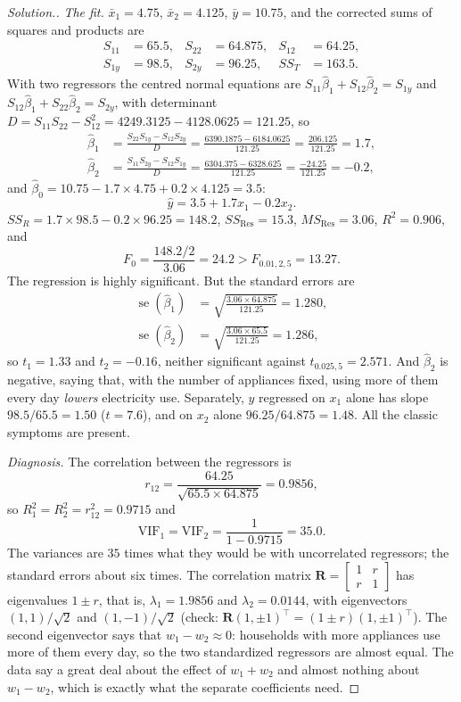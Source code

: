 \documentclass[11pt,a4paper]{article}
\numberwithin{equation}{section}
\theoremstyle{definition}
\newenvironment{solution}
  {\renewcommand{\qedsymbol}{}\begin{proof}[\textit{Solution}.]}
  {\end{proof}}
\begin{document}
\begin{solution}
\emph{The fit.} $\bar x_1 = 4.75$, $\bar x_2 = 4.125$, $\bar y = 10.75$, and the corrected sums of
squares and products are
\begin{align*}
S_{11} &= 65.5, & S_{22} &= 64.875, & S_{12} &= 64.25, \\
S_{1y} &= 98.5, & S_{2y} &= 96.25, & SS_T &= 163.5 .
\end{align*}
With two regressors the centred normal equations are
$S_{11}\hat\beta_1 + S_{12}\hat\beta_2 = S_{1y}$ and $S_{12}\hat\beta_1 + S_{22}\hat\beta_2 = S_{2y}$, with
determinant $D = S_{11}S_{22} - S_{12}^2 = 4249.3125 - 4128.0625 = 121.25$, so
\begin{align*}
\hat\beta_1 &= \frac{S_{22}S_{1y} - S_{12}S_{2y}}{D} = \frac{6390.1875 - 6184.0625}{121.25} = \frac{206.125}{121.25} = 1.7, \\
\hat\beta_2 &= \frac{S_{11}S_{2y} - S_{12}S_{1y}}{D} = \frac{6304.375 - 6328.625}{121.25} = \frac{-24.25}{121.25} = -0.2 ,
\end{align*}
and $\hat\beta_0 = 10.75 - 1.7 \times 4.75 + 0.2 \times 4.125 = 3.5$:
\[
\hat y = 3.5 + 1.7x_1 - 0.2x_2 .
\]
$SS_R = 1.7 \times 98.5 - 0.2 \times 96.25 = 148.2$, $SS_{\mathrm{Res}} = 15.3$, $MS_{\mathrm{Res}} = 3.06$,
$R^2 = 0.906$, and
\[
F_0 = \frac{148.2/2}{3.06} = 24.2 > F_{0.01,2,5} = 13.27 .
\]
The regression is highly significant. But the standard errors are
\begin{align*}
\operatorname{se}(\hat\beta_1) &= \sqrt{\frac{3.06 \times 64.875}{121.25}} = 1.280, \\
\operatorname{se}(\hat\beta_2) &= \sqrt{\frac{3.06 \times 65.5}{121.25}} = 1.286 ,
\end{align*}
so $t_1 = 1.33$ and $t_2 = -0.16$, neither significant against $t_{0.025,5} = 2.571$. And
$\hat\beta_2$ is negative, saying that, with the number of appliances fixed, using more of them
every day \emph{lowers} electricity use. Separately, $y$ regressed on $x_1$ alone has slope
$98.5/65.5 = 1.50$ ($t = 7.6$), and on $x_2$ alone $96.25/64.875 = 1.48$. All the classic symptoms
are present.

\emph{Diagnosis.} The correlation between the regressors is
\[
r_{12} = \frac{64.25}{\sqrt{65.5 \times 64.875}} = 0.9856 ,
\]
so $R_1^2 = R_2^2 = r_{12}^2 = 0.9715$ and
\[
\mathrm{VIF}_1 = \mathrm{VIF}_2 = \frac{1}{1 - 0.9715} = 35.0 .
\]
The variances are $35$ times what they would be with uncorrelated regressors; the standard errors
about six times. The correlation matrix
$\mathbf{R} = \begin{bmatrix} 1 & r \\ r & 1 \end{bmatrix}$ has eigenvalues $1 \pm r$, that is,
$\lambda_1 = 1.9856$ and $\lambda_2 = 0.0144$, with eigenvectors $(1, 1)/\sqrt2$ and $(1, -1)/\sqrt2$
(check: $\mathbf{R}(1, \pm1)^\top = (1 \pm r)(1, \pm1)^\top$). The second eigenvector says that
$w_1 - w_2 \approx 0$: households with more appliances use more of them every day, so the two
standardized regressors are almost equal. The data say a great deal about the effect of
$w_1 + w_2$ and almost nothing about $w_1 - w_2$, which is exactly what the separate coefficients need.
\end{solution}
\end{document}
